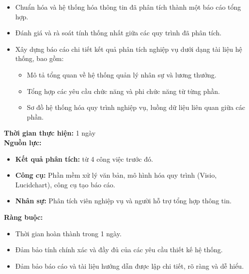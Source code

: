 {\begin{minipage}{\textwidth}
\begin{itemize}
\begin{itemize}
            \item Phân tích nghiệp vụ thanh toán lương.
        \end{itemize}
        \item Chuẩn hóa và hệ thống hóa thông tin đã phân tích thành một báo cáo tổng hợp.
        \item Đánh giá và rà soát tính thống nhất giữa các quy trình đã phân tích.
        \item Xây dựng báo cáo chi tiết kết quả phân tích nghiệp vụ dưới dạng tài liệu hệ thống, bao gồm:
        \begin{itemize}
            \item Mô tả tổng quan về hệ thống quản lý nhân sự và lương thưởng.
            \item Tổng hợp các yêu cầu chức năng và phi chức năng từ từng phần.
            \item Sơ đồ hệ thống hóa quy trình nghiệp vụ, luồng dữ liệu liên quan giữa các phần.
        \end{itemize}
    \end{itemize}
    \vspace{0.5cm}
    \noindent \textbf{Thời gian thực hiện:} 1 ngày \\
    \noindent \textbf{Nguồn lực:}
    \begin{itemize}
        \item \textbf{Kết quả phân tích:} từ 4 công việc trước đó.
        \item \textbf{Công cụ:} Phần mềm xử lý văn bản, mô hình hóa quy trình (Visio, Lucidchart), công cụ tạo báo cáo.
        \item \textbf{Nhân sự:} Phân tích viên nghiệp vụ và người hỗ trợ tổng hợp thông tin.
    \end{itemize}
    \vspace{0.5cm}
    \noindent \textbf{Ràng buộc:}
    \begin{itemize}
        \item Thời gian hoàn thành trong 1 ngày.
        \item Đảm bảo tính chính xác và đầy đủ của các yêu cầu thiết kế hệ thống.
        \item Đảm bảo báo cáo và tài liệu hướng dẫn được lập chi tiết, rõ ràng và dễ hiểu.
    \end{itemize}
    \end{minipage}
}

\newpage %

